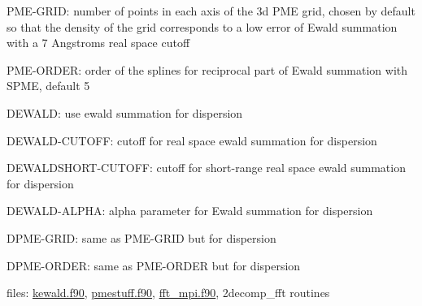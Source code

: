 \begin{DoxyItemize}
\begin{DoxyItemize}
\begin{DoxyItemize}
\item P\-M\-E-\/\-G\-R\-I\-D\-: number of points in each axis of the 3d P\-M\-E grid, chosen by default so that the density of the grid corresponds to a low error of Ewald summation with a 7 Angstroms real space cutoff
\item P\-M\-E-\/\-O\-R\-D\-E\-R\-: order of the splines for reciprocal part of Ewald summation with S\-P\-M\-E, default 5
\item D\-E\-W\-A\-L\-D\-: use ewald summation for dispersion
\item D\-E\-W\-A\-L\-D-\/\-C\-U\-T\-O\-F\-F\-: cutoff for real space ewald summation for dispersion
\item D\-E\-W\-A\-L\-D\-S\-H\-O\-R\-T-\/\-C\-U\-T\-O\-F\-F\-: cutoff for short-\/range real space ewald summation for dispersion
\item D\-E\-W\-A\-L\-D-\/\-A\-L\-P\-H\-A\-: alpha parameter for Ewald summation for dispersion
\item D\-P\-M\-E-\/\-G\-R\-I\-D\-: same as P\-M\-E-\/\-G\-R\-I\-D but for dispersion
\item D\-P\-M\-E-\/\-O\-R\-D\-E\-R\-: same as P\-M\-E-\/\-O\-R\-D\-E\-R but for dispersion
\end{DoxyItemize}
\item files\-: \hyperlink{kewald_8f90}{kewald.\-f90}, \hyperlink{pmestuff_8f90}{pmestuff.\-f90}, \hyperlink{fft__mpi_8f90}{fft\-\_\-mpi.\-f90}, 2decomp\-\_\-fft routines 
\end{DoxyItemize}
\end{DoxyItemize}